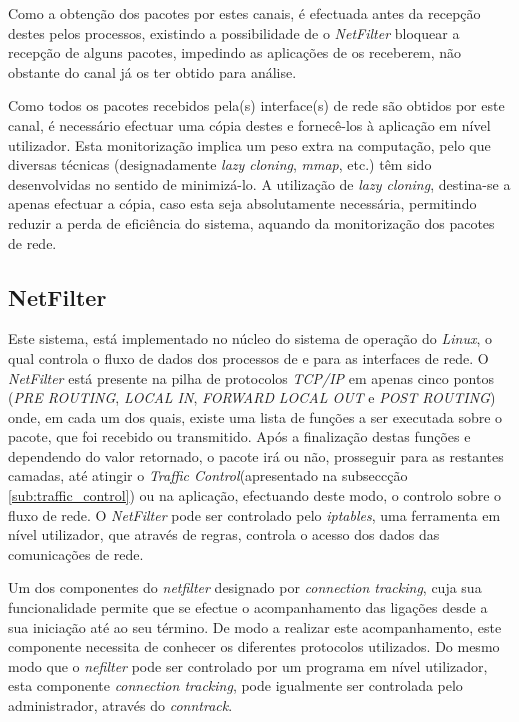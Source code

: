 Como a obtenção dos pacotes por estes canais, é efectuada antes da recepção destes pelos processos, existindo a possibilidade de o \textit{NetFilter} bloquear a recepção de alguns pacotes, impedindo as aplicações de os receberem, não obstante do canal já os ter obtido para análise.

Como todos os pacotes recebidos pela(s) interface(s) de rede são obtidos por este canal, é necessário efectuar uma cópia destes e fornecê-los à aplicação em nível utilizador.
Esta monitorização implica um peso extra na computação, pelo que diversas técnicas (designadamente \textit{lazy cloning}, \textit{mmap}, etc.) têm sido desenvolvidas no sentido de minimizá-lo.
A utilização de \textit{lazy cloning}, destina-se a apenas efectuar a cópia, caso esta seja absolutamente necessária, permitindo reduzir a perda de eficiência do sistema, aquando da monitorização dos pacotes de rede.




\subsection{NetFilter}

Este sistema, está implementado no núcleo do sistema de operação do \textit{Linux}, o qual controla o fluxo de dados dos processos de e para as interfaces de rede.
O \textit{NetFilter} está presente na pilha de protocolos \textit{TCP/IP} em apenas cinco pontos (\textit{PRE ROUTING}, \textit{LOCAL IN}, \textit{FORWARD} \textit{LOCAL OUT} e \textit{POST ROUTING}) onde, em cada um dos quais, existe uma lista de funções a ser executada sobre o pacote, que foi recebido ou transmitido.
Após a finalização destas funções e dependendo do valor retornado, o pacote irá ou não, prosseguir para as restantes camadas, até atingir o \textit{Traffic Control}(apresentado na subseccção \ref{sub:traffic_control}) ou na aplicação, efectuando deste modo, o controlo sobre o fluxo de rede.
O \textit{NetFilter} pode ser controlado pelo \textit{iptables}, uma ferramenta em nível utilizador, que através de regras, controla o acesso dos dados das comunicações de rede.

Um dos componentes do \textit{netfilter} designado por \textit{connection tracking}, cuja sua funcionalidade permite que se efectue o acompanhamento das ligações desde a sua iniciação até ao seu término.
De modo a realizar este acompanhamento, este componente necessita de conhecer os diferentes protocolos utilizados.
Do mesmo modo que o \textit{nefilter} pode ser controlado por um programa em nível utilizador, esta componente \textit{connection tracking}, pode igualmente ser controlada pelo administrador, através do \textit{conntrack}.

